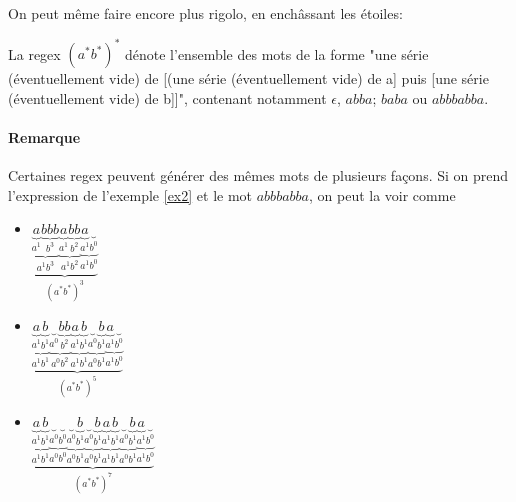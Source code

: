 On peut même faire encore plus rigolo, en enchâssant les étoiles:


\begin{example}
\label{ex2}
La regex $(a^*b^*)^*$ dénote l'ensemble des mots de la forme "une série (éventuellement vide) de [(une série (éventuellement vide) de a] puis [une série (éventuellement vide) de b]]", contenant notamment $\epsilon$, $abba$; $baba$ ou $abbbabba$. 
\end{example}

\paragraph{Remarque} Certaines regex peuvent générer des mêmes mots de plusieurs façons. Si on prend l'expression de l'exemple \ref{ex2} et le mot $abbbabba$, on peut la voir comme 

\begin{itemize}
    \item $\underbrace{\underbrace{\underbrace{a}_\text{$a^1$}\underbrace{bbb}_\text{$b^3$}}_\text{$a^1b^3$}\underbrace{\underbrace{a}_\text{$a^1$}\underbrace{bb}_\text{$b^2$}}_\text{$a^1b^2$}\underbrace{\underbrace{a}_\text{$a^1$}\underbrace{ }_\text{$b^0$}}_\text{$a^1b^0$}}_\text{$(a^*b^*)^3$}$   
    \item $\underbrace{\underbrace{\underbrace{a}_\text{$a^1$}\underbrace{b}_\text{$b^1$}}_\text{$a^1b^1$}\underbrace{\underbrace{ }_\text{$a^0$}\underbrace{bb}_\text{$b^2$}}_\text{$a^0b^2$}\underbrace{\underbrace{a}_\text{$a^1$}\underbrace{b }_\text{$b^1$}}_\text{$a^1b^1$}\underbrace{\underbrace{ }_\text{$a^0$}\underbrace{b }_\text{$b^1$}}_\text{$a^0b^1$}\underbrace{\underbrace{a}_\text{$a^1$}\underbrace{  }_\text{$b^0$}}_\text{$a^1b^0$}}_\text{$(a^*b^*)^5$}$
   
    \item $\underbrace{\underbrace{\underbrace{a}_\text{$a^1$}\underbrace{b}_\text{$b^1$}}_\text{$a^1b^1$}\underbrace{\underbrace{ }_\text{$a^0$}\underbrace{ }_\text{$b^0$}}_\text{$a^0b^0$}\underbrace{\underbrace{ }_\text{$a^0$}\underbrace{b}_\text{$b^1$}}_\text{$a^0b^1$}\underbrace{\underbrace{ }_\text{$a^0$}\underbrace{b}_\text{$b^1$}}_\text{$a^0b^1$}\underbrace{\underbrace{a}_\text{$a^1$}\underbrace{b }_\text{$b^1$}}_\text{$a^1b^1$}\underbrace{\underbrace{ }_\text{$a^0$}\underbrace{b }_\text{$b^1$}}_\text{$a^0b^1$}\underbrace{\underbrace{a}_\text{$a^1$}\underbrace{  }_\text{$b^0$}}_\text{$a^1b^0$}}_\text{$(a^*b^*)^7$}$
\end{itemize}

